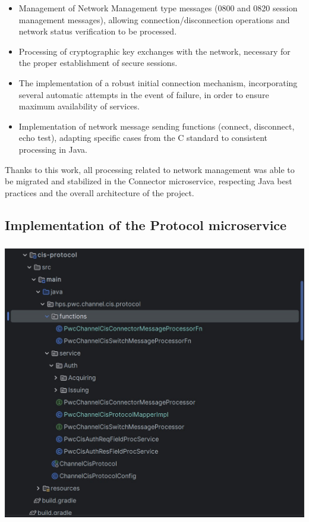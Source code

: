 \documentclass[12pt,a4paper]{report}
\begin{document}
\begin{itemize}
\item
  Management of Network Management type messages (0800 and 0820 session
  management messages), allowing connection/disconnection operations and
  network status verification to be processed.
\item
  Processing of cryptographic key exchanges with the network, necessary
  for the proper establishment of secure sessions.
\item
  The implementation of a robust initial connection mechanism,
  incorporating several automatic attempts in the event of failure, in
  order to ensure maximum availability of services.
\item
  Implementation of network message sending functions (connect,
  disconnect, echo test), adapting specific cases from the C standard to
  consistent processing in Java.
\end{itemize}

Thanks to this work, all processing related to network management was
able to be migrated and stabilized in the Connector microservice,
respecting Java best practices and the overall architecture of the
project.

\hypertarget{implementation-of-the-protocol-microservice}{%
\subsection{\texorpdfstring{\textbf{Implementation of the Protocol
microservice}}{Implementation of the Protocol microservice}}\label{implementation-of-the-protocol-microservice}}

\includegraphics[width=5.41531in,height=4.86478in]{vertopal_d1b0b2209edd4c6aa8254f57daa0953b/media/image64.jpg}
\end{document}
